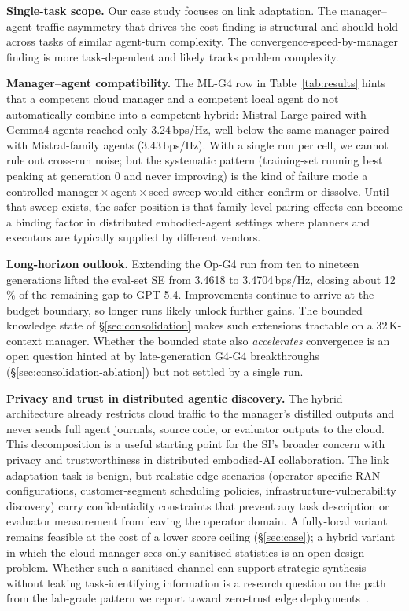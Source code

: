 \documentclass[journal]{IEEEtran}
\begin{document}
\textbf{Single-task scope.} Our case study focuses on link adaptation. The manager--agent traffic asymmetry that drives the cost finding is structural and should hold across tasks of similar agent-turn complexity. The convergence-speed-by-manager finding is more task-dependent and likely tracks problem complexity.

\textbf{Manager--agent compatibility.} The ML-G4 row in Table~\ref{tab:results} hints that a competent cloud manager and a competent local agent do not automatically combine into a competent hybrid: Mistral Large paired with Gemma4 agents reached only 3.24\,bps/Hz, well below the same manager paired with Mistral-family agents (3.43\,bps/Hz). With a single run per cell, we cannot rule out cross-run noise; but the systematic pattern (training-set running best peaking at generation 0 and never improving) is the kind of failure mode a controlled manager\,$\times$\,agent\,$\times$\,seed sweep would either confirm or dissolve. Until that sweep exists, the safer position is that family-level pairing effects can become a binding factor in distributed embodied-agent settings where planners and executors are typically supplied by different vendors.

\textbf{Long-horizon outlook.} Extending the Op-G4 run from ten to nineteen generations lifted the eval-set SE from 3.4618 to 3.4704\,bps/Hz, closing about 12\,\% of the remaining gap to GPT-5.4. Improvements continue to arrive at the budget boundary, so longer runs likely unlock further gains. The bounded knowledge state of \S\ref{sec:consolidation} makes such extensions tractable on a 32\,K-context manager. Whether the bounded state also \emph{accelerates} convergence is an open question hinted at by late-generation G4-G4 breakthroughs (\S\ref{sec:consolidation-ablation}) but not settled by a single run.

\textbf{Privacy and trust in distributed agentic discovery.} The hybrid architecture already restricts cloud traffic to the manager's distilled outputs and never sends full agent journals, source code, or evaluator outputs to the cloud. This decomposition is a useful starting point for the SI's broader concern with privacy and trustworthiness in distributed embodied-AI collaboration. The link adaptation task is benign, but realistic edge scenarios (operator-specific RAN configurations, customer-segment scheduling policies, infrastructure-vulnerability discovery) carry confidentiality constraints that prevent any task description or evaluator measurement from leaving the operator domain. A fully-local variant remains feasible at the cost of a lower score ceiling (\S\ref{sec:case}); a hybrid variant in which the cloud manager sees only sanitised statistics is an open design problem. Whether such a sanitised channel can support strategic synthesis without leaking task-identifying information is a research question on the path from the lab-grade pattern we report toward zero-trust edge deployments~\cite{TODO_privacy_edge}.
\end{document}
